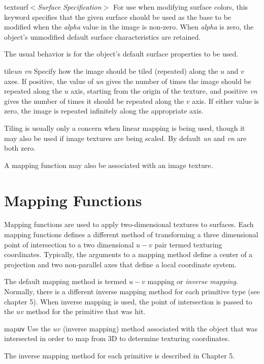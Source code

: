 \begin{defkey}{textsurf}{$<${\em Surface Specification}$>$}
	For use when modifying surface colors, this keyword specifies
	that the given surface should be used as the base
	to be modified when the {\em alpha} value in the image
	is non-zero.  When {\em alpha} is zero, the object's
	unmodified default surface characteristics are retained.
\end{defkey}
The usual behavior is for the object's default surface properties to
be used.

\begin{defkey}{tile}{{\em un vn}}
	Specify how the image should be tiled (repeated) along the
	$u$ and $v$ axes.
	If positive, the value of {\em un} gives the number of
	times the image should be repeated along the $u$ axis, starting
	from the origin of the texture, and positive {\em vn} gives the
	number of times it
	should be repeated along the $v$ axis.  If either value is zero,
	the image is repeated infinitely along the appropriate axis.
\end{defkey}
Tiling is usually only a concern when linear mapping is being used,
though it may also be used if image textures are being scaled.  By default
{\em un} and {\em vn} are both zero.
 

A mapping function may also be associated with an image texture.

\section {Mapping Functions}

Mapping functions are used to apply two-dimensional textures to
surfaces.  Each mapping functions defines a different method of transforming
a three dimensional point of intersection to a two dimensional $u-v$ pair
termed texturing coordinates.
Typically, the arguments to a mapping method define a center of
a projection and two non-parallel axes that define a local coordinate system.

The default mapping method is termed $u-v$ mapping or {\em inverse mapping}.
Normally, there is a different inverse mapping method for each primitive type
(see chapter 5).
When inverse mapping is used, the point of intersection is passed to
the $uv$ method for the primitive that was hit.

\begin{defkey}{map}{{\tt uv}}
	Use the $uv$ (inverse mapping) method associated with the
	object that was intersected in order to map from 3D to determine
	texturing coordinates.
\end{defkey}
The inverse mapping method for each primitive is described in Chapter 5.

